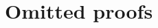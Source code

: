 \documentclass[11pt]{article}
\begin{document}








\appendix

\section{Omitted proofs}\label{sec:omitted Proofs}
\end{document}

